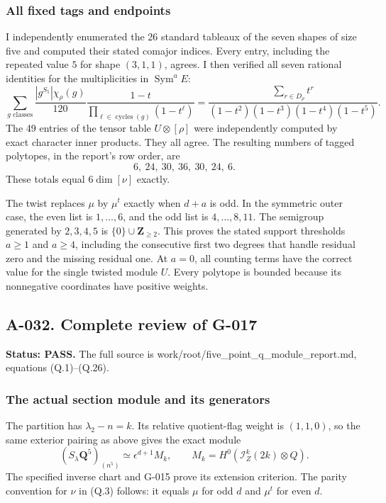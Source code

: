 \documentclass[
  10pt,
]{article}
\begin{document}
\subsubsection{All fixed tags and
endpoints}\label{all-fixed-tags-and-endpoints}

I independently enumerated the 26 standard tableaux of the seven shapes
of size five and computed their stated comajor indices. Every entry,
including the repeated value \(5\) for shape \((3,1,1)\), agrees. I then
verified all seven rational identities for the multiplicities in
\(\operatorname{Sym}^aE\): \[
\sum_{g\text{ classes}}\frac{|g^{S_5}|\chi_\rho(g)}{120}
\frac{1-t}{\prod_{\ell\in\operatorname{cycles}(g)}(1-t^\ell)}
=\frac{\sum_{r\in D_\rho}t^r}
{(1-t^2)(1-t^3)(1-t^4)(1-t^5)}.
\] The 49 entries of the tensor table \(U\otimes[\rho]\) were
independently computed by exact character inner products. They all
agree. The resulting numbers of tagged polytopes, in the report's row
order, are \[
6,\ 24,\ 30,\ 36,\ 30,\ 24,\ 6.
\] These totals equal \(6\dim[\nu]\) exactly.

The twist replaces \(\mu\) by \(\mu^t\) exactly when \(d+a\) is odd. In
the symmetric outer case, the even list is \(1,\ldots,6\), and the odd
list is \(4,\ldots,8,11\). The semigroup generated by \(2,3,4,5\) is
\(\{0\}\cup\mathbf Z_{\ge2}\). This proves the stated support thresholds
\(a\ge1\) and \(a\ge4\), including the consecutive first two degrees
that handle residual zero and the missing residual one. At \(a=0\), all
counting terms have the correct value for the single twisted module
\(U\). Every polytope is bounded because its nonnegative coordinates
have positive weights.

\subsection{A-032. Complete review of
G-017}\label{a-032.-complete-review-of-g-017}

\textbf{Status: PASS.} The full source is
work/root/five\_point\_q\_module\_report.md, equations (Q.1)--(Q.26).

\subsubsection{The actual section module and its
generators}\label{the-actual-section-module-and-its-generators}

The partition has \(\lambda_2-n=k\). Its relative quotient-flag weight
is \((1,1,0)\), so the same exterior pairing as above gives the exact
module \[
(S_\lambda\mathbf Q^5)_{(n^5)}
\simeq\epsilon^{d+1}M_k,\qquad
M_k=H^0(\mathcal I_Z^k(2k)\otimes Q).
\] The specified inverse chart and G-015 prove its extension criterion.
The parity convention for \(\nu\) in (Q.3) follows: it equals \(\mu\)
for odd \(d\) and \(\mu^t\) for even \(d\).
\end{document}
